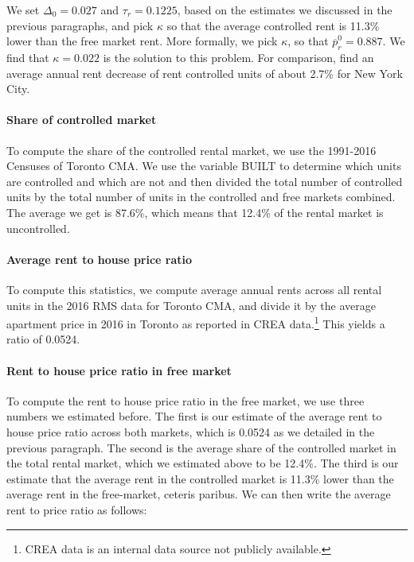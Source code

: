 \documentclass[parskip=full]{article}
\begin{document}
We set $\Delta_{0}=0.027$ and $\tau_{r}=0.1225$, based on the estimates we discussed in the previous paragraphs, and pick $\kappa$ so that the average controlled rent is 11.3\% lower than the free market rent. More formally, we pick $\kappa$, so that $\overline{p}^{0}_{r}=0.887$. We find that $\kappa=0.022$ is the solution to this problem. For comparison, \citet{fmn-2022} find an average annual rent decrease of rent controlled units of about 2.7\% for New York City.

\paragraph{Share of controlled market}

To compute the share of the controlled rental market, we use the 1991-2016 Censuses of Toronto CMA. We use the variable BUILT to determine which units are controlled and which are not and then divided the total number of controlled units by the total number of units in the controlled and free markets combined. The average we get is 87.6\%, which means that 12.4\% of the rental market is uncontrolled. 

\paragraph{Average rent to house price ratio}

To compute this statistics, we compute average annual rents across all rental units in the 2016 RMS data for Toronto CMA, and divide it by the average apartment price in 2016 in Toronto as reported in CREA data.\footnote{CREA data is an internal data source not publicly available.} This yields a ratio of 0.0524.

\paragraph{Rent to house price ratio in free market}

To compute the rent to house price ratio in the free market, we use three numbers we estimated before. The first is our estimate of the average rent to house price ratio across both markets, which is 0.0524 as we detailed in the previous paragraph. The second is the average share of the controlled market in the total rental market, which we estimated above to be 12.4\%. The third is our estimate that the average rent in the controlled market is 11.3\% lower than the average rent in the free-market, ceteris paribus. We can then write the average rent to price ratio as follows:
\end{document}
